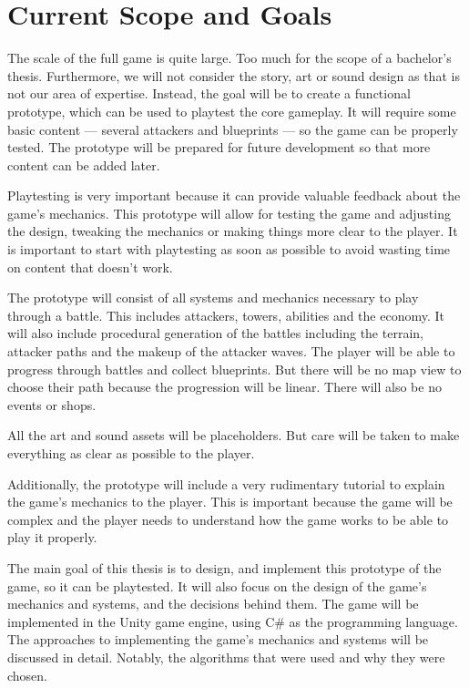 
\section{Current Scope and Goals}

The scale of the full game is quite large.
Too much for the scope of a bachelor's thesis.
Furthermore, we will not consider the story, art or sound design as that is not our area of expertise.
Instead, the goal will be to create a functional prototype, which can be used to playtest the core gameplay.
It will require some basic content --- several attackers and blueprints --- so the game can be properly tested.
The prototype will be prepared for future development so that more content can be added later.

Playtesting is very important because it can provide valuable feedback about the game's mechanics.
This prototype will allow for testing the game and adjusting the design, tweaking the mechanics or making things more clear to the player.
It is important to start with playtesting as
soon as possible to avoid wasting time on content that doesn't work.

The prototype will consist of all systems and mechanics necessary to play through a battle.
This includes attackers, towers, abilities and the economy.
It will also include procedural generation of the battles including the terrain, attacker paths and the makeup of the attacker waves.
The player will be able to progress through battles and collect blueprints.
But there will be no map view to choose their path because the progression will be linear.
There will also be no events or shops.

All the art and sound assets will be placeholders.
But care will be taken to make everything as clear as possible to the player.

Additionally, the prototype will include a very rudimentary tutorial to explain the game's mechanics to the player.
This is important because the game will be complex and the player needs to understand how the game works to be able to play it properly.

The main goal of this thesis is to design, and implement this prototype of the game, so it can be playtested.
It will also focus on the design of the game's mechanics and systems, and the decisions behind them.
The game will be implemented in the Unity game engine, using C\# as the programming language.
The approaches to implementing the game's mechanics and systems will be discussed in detail.
Notably, the algorithms that were used and why they were chosen.
